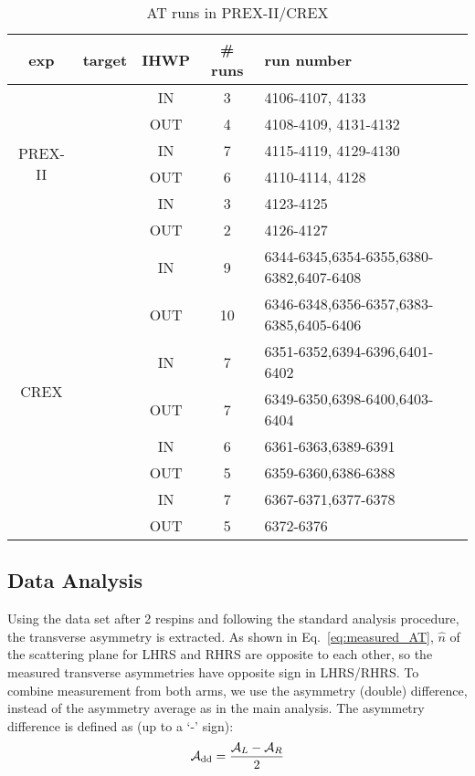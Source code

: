 \begin{table}[!h]
    \centering
    \begin{tabular}{c | c | c | c | l}
	\hline
	exp & target	& IHWP	& \# runs    & run number    \\
	\hline
	\multirow{6}{*}{PREX-II}    & \multirow{2}{*}{\C}   & IN    & 3	& 4106-4107, 4133    \\
	    &   & OUT   & 4 & 4108-4109, 4131-4132   \\
	    \cline{2-5}
	    & \multirow{2}{*}{\Pb}  & IN    & 7	& 4115-4119, 4129-4130  \\
	    &	& OUT	& 6 & 4110-4114, 4128   \\
	    \cline{2-5}
	    & \multirow{2}{*}{\ca}  & IN    & 3	& 4123-4125	\\
	    &	& OUT	& 2 & 4126-4127 \\
	\hline
	\multirow{8}{*}{CREX}	& \multirow{2}{*}{\Ca}	& IN	& 9 & 6344-6345,6354-6355,6380-6382,6407-6408\\
	    &	& OUT	& 10	& 6346-6348,6356-6357,6383-6385,6405-6406   \\
	    \cline{2-5}
	    & \multirow{2}{*}{\ca}	& IN	& 7 & 6351-6352,6394-6396,6401-6402	\\
	    &	& OUT	& 7 & 6349-6350,6398-6400,6403-6404	\\
	    \cline{2-5}
	    & \multirow{2}{*}{\C}	& IN	& 6 & 6361-6363,6389-6391	\\
	    &	& OUT	& 5 & 6359-6360,6386-6388	\\
	    \cline{2-5}
	    & \multirow{2}{*}{\Pb}	& IN	& 7 & 6367-6371,6377-6378	\\
	    &	& OUT	& 5 & 6372-6376 \\
	\hline
    \end{tabular}
    \caption{AT runs in PREX-II/CREX}
\end{table}

\subsection{Data Analysis}
Using the data set after 2 respins and following the standard analysis procedure, 
the transverse asymmetry is extracted. As shown in Eq.~\ref{eq:measured_AT},
$\hat{n}$ of the scattering plane for LHRS and RHRS are opposite to each other,
so the measured transverse asymmetries have opposite sign in LHRS/RHRS. To
combine measurement from both arms, we use the asymmetry (double) difference, 
instead of the asymmetry average as in the main analysis. The asymmetry difference
is defined as (up to a `-' sign):
\begin{equation}
    \mathcal{A}_{\text{dd}} = \frac{\mathcal{A}_L - \mathcal{A}_R}{2}
\end{equation}

